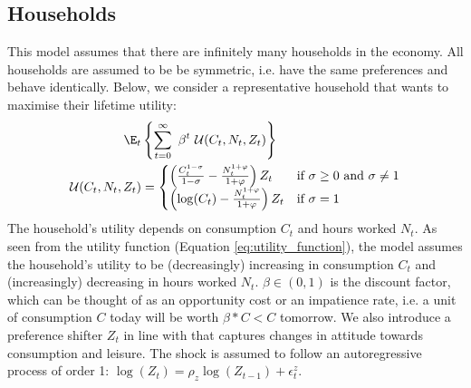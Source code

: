 \subsection{Households}
This model assumes that there are infinitely many households in the economy. All households are assumed to be be symmetric, i.e. have the same preferences and behave identically. Below, we consider a representative household that wants to maximise their lifetime utility:
\begin{align}
    \E_t &\left\{\sum^{\infty}_{t=0} \ \beta^t \ \mathcal{U}(C_t, N_t, Z_t)\right\} \label{eq:lifetime_utility}\\
    \mathcal{U}(C_t, N_t, Z_t) &= 
    \begin{cases}
        \left( \frac{C_t^{1-\sigma}}{1-\sigma} - \frac{N_t^{1+\varphi}}{1+\varphi} \right)Z_t & \text{if $\sigma \geq 0$ and $\sigma \ne 1$}\\
        \left( \log(C_t) - \frac{N_t^{1+\varphi}}{1+\varphi} \right)Z_t & \text{if $\sigma = 1$}
    \end{cases}
    \label{eq:utility_function}
\end{align}
The household's utility depends on consumption $C_t$ and hours worked $N_t$. As seen from the utility function (Equation \ref{eq:utility_function}), the model assumes the household's utility to be (decreasingly) increasing in consumption $C_t$ and (increasingly) decreasing in hours worked $N_t$. $\beta \in (0,1)$ is the discount factor, which can be thought of as an opportunity cost or an impatience rate, i.e. a unit of consumption $C$ today will be worth $\beta * C < C$ tomorrow. We also introduce a preference shifter $Z_t$ in line with \textcite[225]{jordigal_2015_monetary} that captures changes in attitude towards consumption and leisure. The shock is assumed to follow an autoregressive process of order 1: $\log (Z_t) = \rho_z \log (Z_{t-1}) + \epsilon^z_{t}$.

